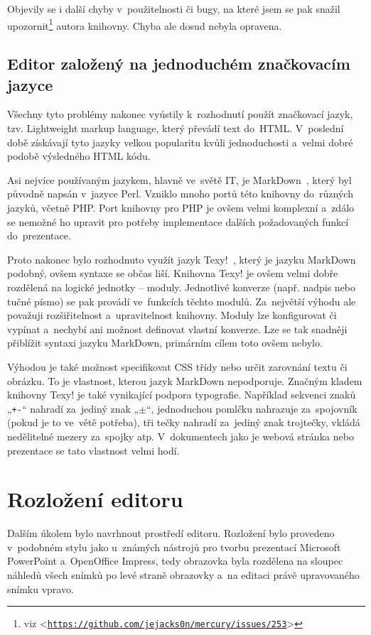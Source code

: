 \documentclass[11pt,twoside,a4paper]{book}
\let\oldUrl\url									%
\renewcommand\url[1]{<\texttt{\oldUrl{#1}}>}
\begin{document}
Objevily se i další chyby v~použitelnosti či bugy, na které jsem se pak snažil upozornit\footnote{viz \url{https://github.com/jejacks0n/mercury/issues/253}} autora knihovny. Chyba ale dosud nebyla opravena.

\subsection{Editor založený na jednoduchém značkovacím jazyce}
Všechny tyto problémy nakonec vyústily k~rozhodnutí použít značkovací jazyk, tzv. Light\-weight markup language, který
převádí text do~HTML. V~poslední době získávají tyto jazyky velkou popularitu kvůli jednoduchosti a~velmi dobré podobě
výsledného HTML kódu.

Asi nejvíce používaným jazykem, hlavně ve~světě IT, je Mark\-Down~\cite{markdown}, který byl původně napsán v~jazyce Perl. Vzniklo mnoho portů této knihovny do~různých jazyků, včetně PHP. Port knihovny pro PHP je ovšem velmi komplexní a~zdálo se nemožné ho upravit pro potřeby imple\-mentace dalších požadovaných funkcí do~prezentace.

Proto nakonec bylo rozhodnuto využít jazyk Texy!~\cite{texy}, který je jazyku Mark\-Down podobný, ovšem syntaxe se občas liší. Knihovna Texy! je ovšem velmi dobře rozdělená na logické jednotky – moduly. Jednotlivé konverze (např. nadpis nebo tučné písmo) se pak provádí ve~funkcích těchto modulů. Za~největší výhodu ale považuji rozšiřitelnost a~upravitelnost knihovny. Moduly lze konfigurovat či vypínat a~nechybí ani možnost definovat vlastní konverze. Lze se tak snadněji přiblížit syntaxi jazyku Mark\-Down, primárním cílem toto ovšem nebylo.

Výhodou je také možnost specifikovat CSS třídy nebo určit zarovnání textu či obrázku. To je vlastnost, kterou jazyk Mark\-Down nepodporuje. Značným kladem knihovny Texy! je také vynikající podpora typografie. Například sekvenci znaků „\lstinline|+-|“ nahradí za~jediný znak „$\pm$“, jednoduchou pomlčku nahrazuje za~spojovník (pokud je to ve~větě potřeba), tři tečky nahradí za~jediný znak trojtečky, vkládá nedělitelné mezery za~spojky atp. V~dokumentech jako je webová stránka nebo prezentace se tato vlastnost velmi hodí.


\section{Rozložení editoru}
Dalším úkolem bylo navrhnout prostředí editoru. Rozložení bylo provedeno v~podobném stylu jako u~známých nástrojů pro tvorbu prezentací Microsoft PowerPoint a~OpenOffice Impress, tedy obrazovka byla rozdělena na sloupec náhledů všech snímků po levé straně obrazovky a~na editaci právě upravovaného snímku vpravo.
\end{document}
